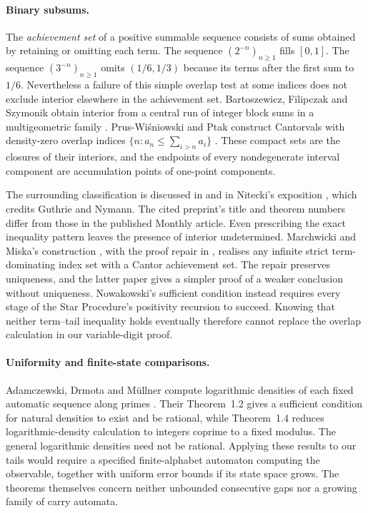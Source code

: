 \documentclass[11pt]{article}
\begin{document}
\paragraph{Binary subsums.}
The \emph{achievement set} of a positive summable sequence consists of
sums obtained by retaining or omitting each term.  The sequence
$(2^{-n})_{n\ge1}$ fills $[0,1]$.  The sequence $(3^{-n})_{n\ge1}$
omits $(1/6,1/3)$ because its terms after the first sum to $1/6$.
Nevertheless a failure of this simple overlap test at some indices does
not exclude interior elsewhere in the achievement set.
Bartoszewicz, Filipczak and Szymonik obtain interior from a central run
of integer block sums in a multigeometric family
\cite[Theorem~2]{bartoszewicz2014}.
Prus-Wi\'sniowski and Ptak construct Cantorvals with density-zero overlap
indices $\{n:a_n\le\sum_{i>n}a_i\}$ \cite[Theorem]{prusptak2024}.
These compact sets are the closures of their interiors, and the endpoints
of every nondegenerate interval component are accumulation points of
one-point components.

The surrounding classification is discussed in \cite[\S1]{glabprus2025}
and in Nitecki's exposition \cite[Theorem~14]{nitecki2015}, which credits
Guthrie and Nymann.  The cited preprint's title and theorem numbers differ
from those in the published Monthly article.
Even prescribing the exact inequality pattern leaves the presence of
interior undetermined.  Marchwicki and Miska's construction
\cite[Theorem~2.1]{marchwickimiska2021}, with the proof repair in
\cite{miskaprusptak2023}, realises any infinite strict term-dominating
index set with a Cantor achievement set.  The repair preserves uniqueness,
and the latter paper gives a simpler proof of a weaker conclusion without
uniqueness.  Nowakowski's sufficient condition
\cite[Definition~2, Theorem~3.1]{nowakowski2025} instead requires every
stage of the Star Procedure's positivity recursion to succeed.
Knowing that neither term--tail inequality holds eventually therefore
cannot replace the overlap calculation in our variable-digit proof.

\paragraph{Uniformity and finite-state comparisons.}
Adamczewski, Drmota and M\"ullner compute logarithmic densities of each
fixed automatic sequence along primes \cite[Theorems~1.2, 1.4]{adm2022}.
Their Theorem~1.2 gives a sufficient condition for natural densities to
exist and be rational, while Theorem~1.4 reduces logarithmic-density
calculation to integers coprime to a fixed modulus.  The general
logarithmic densities need not be rational.  Applying these results to
our tails would require a specified finite-alphabet automaton computing
the observable, together with uniform error bounds if its state space
grows.  The theorems themselves concern neither unbounded consecutive
gaps nor a growing family of carry automata.
\end{document}
